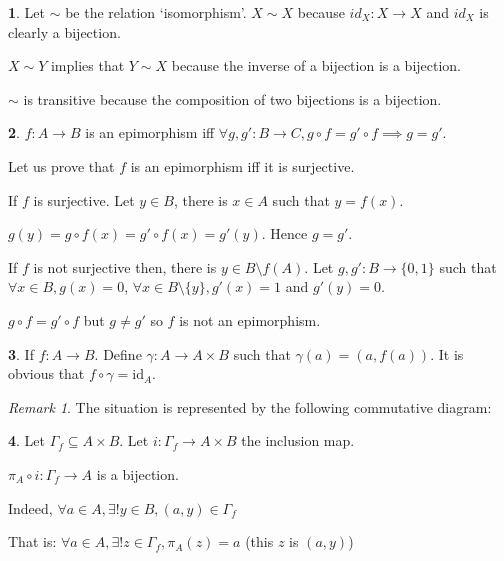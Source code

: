 \documentclass[11pt]{article}
\theoremstyle{definition}
\newtheorem{exo}{}[subsection]
\theoremstyle{remark}
\newtheorem*{rmq}{Remark}
\def\subset{\subseteq}
\def\id{\mathrm{id}}
\begin{document}
\begin{exo}
	Let $\sim$ be the relation `isomorphism'.
	$X\sim X$ because $id_X:X\to X$ and $id_X$ is clearly a bijection.

	$X\sim Y$ implies that $Y\sim X$ because the inverse of a bijection is a bijection.

	$\sim$ is transitive because the composition of two bijections is a bijection.
\end{exo}

\begin{exo}
	$f:A\to B$ is an epimorphism iff $\forall g,g':B\to C,g\circ f=g'\circ f\implies g=g'$.

	Let us prove that $f$ is an epimorphism iff it is surjective.

	If $f$ is surjective. Let $y\in B$, there is $x\in A$ such that $y=f(x)$.

	$g(y)=g\circ f(x)=g'\circ f(x)=g'(y)$. Hence $g=g'$.

	If $f$ is not surjective then, there is $y\in B\setminus f(A)$. Let $g,g':B\to\{0,1\}$ such that $\forall x\in B,g(x)=0$, $\forall x\in B\setminus\{y\},g'(x)=1$ and $g'(y)=0$.
	
	$g\circ f=g'\circ f$ but $g\neq g'$ so $f$ is not an epimorphism.
\end{exo}

\begin{exo}
	If $f:A\to B$. Define $\gamma:A\to A\times B$ such that $\gamma(a)=(a,f(a))$. It is obvious that $f\circ\gamma=\id_A$.
\end{exo}

\begin{rmq}
	The situation is represented by the following commutative diagram:

\end{rmq}

\begin{exo}
	Let $\Gamma_f\subset A\times B$. Let $i:\Gamma_f\to A\times B$ the inclusion map.

	$\pi_A\circ i:\Gamma_f\to A$ is a bijection.

	Indeed, $\forall a\in A,\exists! y\in B,(a,y)\in\Gamma_f$

	That is: $\forall a\in A,\exists! z\in\Gamma_f,\pi_A(z)=a$ (this $z$ is $(a,y)$)
\end{exo}
\end{document}
